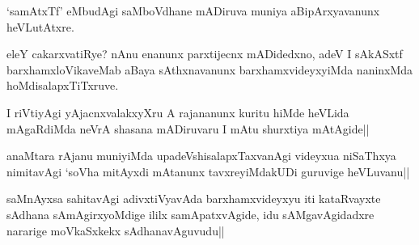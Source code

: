 \begin{artha}
`samAtxTf' eMbudAgi saMboVdhane mADiruva muniya aBipArxyavanunx heVLutAtxre.
\end{artha}

\begin{artha}
eleY cakarxvatiRye? nAnu enanunx parxtijecnx mADidedxno, adeV I sAkASxtf barxhamxloVikaveMab aBaya sAthxnavanunx barxhamxvideyxyiMda naninxMda hoMdisalapxTiTxruve.
\end{artha}


\begin{artha}
I riVtiyAgi yAjacnxvalakxyXru A rajananunx kuritu hiMde heVLida mAgaRdiMda neVrA shasana mADiruvaru I mAtu shurxtiya mAtAgide||
\end{artha}


\begin{artha}
anaMtara rAjanu muniyiMda upadeVshisalapxTaxvanAgi videyxua niSaThxya nimitavAgi `soV\s ha mitAyxdi mAtanunx tavxreyiMdakUDi guruvige heVLuvanu||
\end{artha}


\begin{artha}
saMnAyxsa sahitavAgi adivxtiVyavAda barxhamxvideyxyu iti kataRvayxte sAdhana sAmAgirxyoMdige ililx samApatxvAgide, idu sAMgavAgidadxre nararige moVkaSxkekx sAdhanavAguvudu||
\end{artha}
